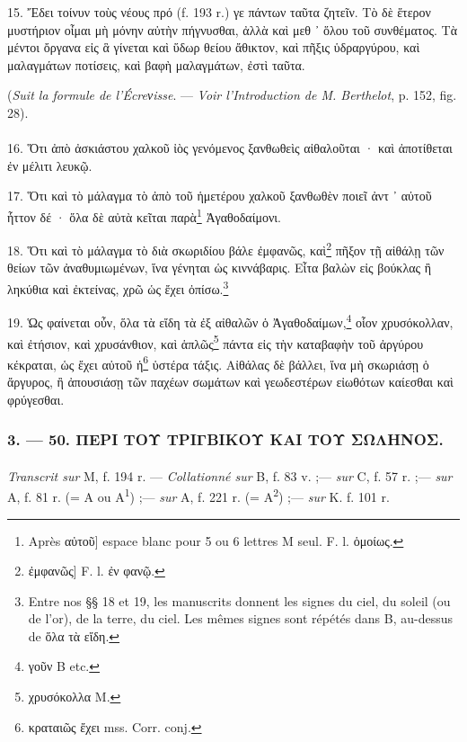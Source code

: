 \documentclass[a4paper, 11pt, oneside, polutonikogreek, french]{article}
\begin{document}
15. Ἔδει τοίνυν τοὺς νέους πρό (f. 193 r.) γε πάντων ταῦτα ζητεῖν. Τὸ δὲ ἕτερον μυστήριον οἶμαι μὴ μόνην αὐτὴν πήγνυσθαι, ἀλλὰ καὶ μεθ ᾽ ὅλου τοῦ συνθέματος. Τὰ μέντοι ὄργανα εἰς ἃ γίνεται καὶ ὕδωρ θείου ἄθικτον, καὶ πῆξις ὑδραργύρου, καὶ μαλαγμάτων ποτίσεις, καὶ βαφὴ μαλαγμάτων, ἐστὶ ταῦτα.
\begin{center}
(\emph{Suit la formule de l'Écreνisse}. --- \emph{Voir l'Introduction de M. Berthelot}, p. 152, fig. 28).
\end{center}
\paragraph{}
16. Ὅτι ἀπὸ ἀσκιάστου χαλκοῦ ἰὸς γενόμενος ξανθωθεὶς αἰθαλοῦται · καὶ ἀποτίθεται ἐν μέλιτι λευκῷ.

17. Ὅτι καὶ τὸ μάλαγμα τὸ ἀπὸ τοῦ ἡμετέρου χαλκοῦ ξανθωθὲν ποιεῖ ἀντ ᾽ αὐτοῦ       ἧττον δέ · ὅλα δὲ αὐτὰ κεῖται παρὰ\footnote{Après αὐτοῦ] espace blanc pour 5 ou 6 lettres M seul. F. l. ὁμοίως.} Ἀγαθοδαίμονι.

18. Ὅτι καὶ τὸ μάλαγμα τὸ διὰ σκωριδίου βάλε ἐμφανῶς, καὶ\footnote{ἐμφανῶς] F. l. ἐν φανῷ.} πῆξον τῇ αἰθάλῃ τῶν θείων τῶν ἀναθυμιωμένων, ἵνα γένηται ὡς κιννάβαρις. Εἶτα βαλὼν εἰς βούκλας ἢ ληκύθια καὶ ἐκτείνας, χρῶ ὡς ἔχει ὀπίσω.\footnote{Entre nos §§ 18 et 19, les manuscrits donnent les signes du ciel, du soleil (ou de l'or), de la terre, du ciel. Les mêmes signes sont répétés dans B, au-dessus de ὅλα τὰ εἴδη.}

19. Ὡς φαίνεται οὖν, ὅλα τὰ εἴδη τὰ ἐξ αἰθαλῶν ὁ Ἀγαθοδαίμων,\footnote{γοῦν B etc.} οἷον χρυσόκολλαν, καὶ ἐτήσιον, καὶ χρυσάνθιον, καὶ ἁπλῶς\footnote{χρυσόκολλα M.} πάντα εἰς τὴν καταβαφὴν τοῦ ἀργύρου κέκραται, ὡς ἔχει αὐτοῦ ἡ\footnote{κραταιῶς ἔχει mss. Corr. conj.} ὑστέρα τάξις. Αἰθάλας δὲ βάλλει, ἵνα μὴ σκωριάσῃ ὁ ἄργυρος, ἢ ἀπουσιάσῃ τῶν παχέων σωμάτων καὶ γεωδεστέρων εἰωθότων καίεσθαι καὶ φρύγεσθαι.

\bigskip
\centerline{\EightStarTaper}
\centerline{\EightStarTaper\EightStarTaper}
\bigskip

\subsubsection{3. --- 50. ΠΕΡΙ ΤΟΥ ΤΡΙΓΒΙΚΟΥ ΚΑΙ ΤΟΥ ΣΩΛΗΝΟΣ.}
\paragraph{}
\emph{Transcrit sur} M, f. 194 r. --- \emph{Collationné sur} B, f. 83 v. ;--- \emph{sur} C, f. 57 r. ;--- \emph{sur} A, f. 81 r. (= A ou A\textsuperscript{1}) ;--- \emph{sur} A, f. 221 r. (= A\textsuperscript{2}) ;--- \emph{sur} K. f. 101 r.
\end{document}

